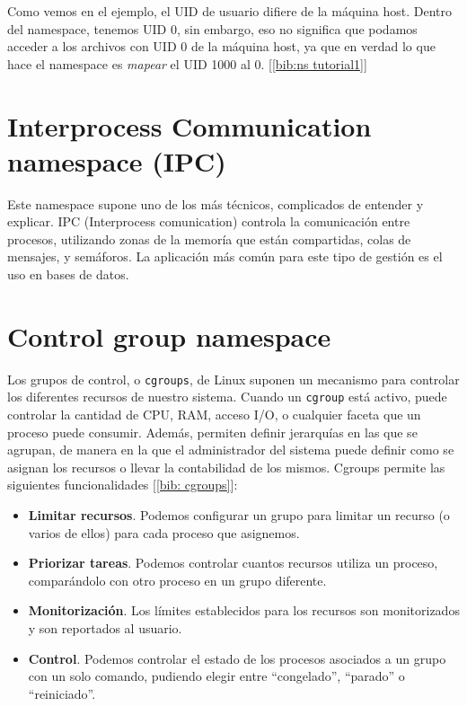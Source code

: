 \documentclass[a4paper, oneside, 12pt]{book}
\begin{document}
	\addvspace{20px}
	
	\par \noindent Como vemos en el ejemplo, el UID de usuario difiere de la máquina host. Dentro del namespace, tenemos UID 0, sin embargo, eso no significa que podamos acceder a los archivos con UID 0 de la máquina host, ya que en verdad lo que hace el namespace es \textit{mapear} el UID 1000 al 0. [\ref{bib:ns tutorial1}]
	
	
	\section{Interprocess Communication namespace (IPC)}
	\par \noindent Este namespace supone uno de los más técnicos, complicados de entender y explicar. IPC (Interprocess comunication) controla la comunicación entre procesos, utilizando zonas de la memoría que están compartidas, colas de mensajes, y semáforos. La aplicación más común para este tipo de gestión es el uso en bases de datos.
	
	\pagebreak
	
	\section{Control group namespace}
	\par \noindent Los grupos de control, o \texttt{cgroups}, de Linux suponen un mecanismo para controlar los diferentes recursos de nuestro sistema. Cuando un \texttt{cgroup} está activo, puede controlar la cantidad de CPU, RAM, acceso I/O, o cualquier faceta que un proceso puede consumir. Además, permiten definir jerarquías en las que se agrupan, de manera en la que el administrador del sistema puede definir como se asignan los recursos o llevar la contabilidad de los mismos. Cgroups permite las siguientes funcionalidades [\ref{bib: cgroups}]: 
	\begin{itemize}
		\item \textbf{Limitar recursos}. Podemos configurar un grupo para limitar un recurso (o varios de ellos) para cada proceso que asignemos.
		\item \textbf{Priorizar tareas}. Podemos controlar cuantos recursos utiliza un proceso, comparándolo con otro proceso en un grupo diferente.
		\item \textbf{Monitorización}. Los límites establecidos para los recursos son monitorizados y son reportados al usuario.
		\item \textbf{Control}. Podemos controlar el estado de los procesos asociados a un grupo con un solo comando, pudiendo elegir entre ``congelado'', ``parado'' o ``reiniciado''.
	\end{itemize}
	
\end{document}
